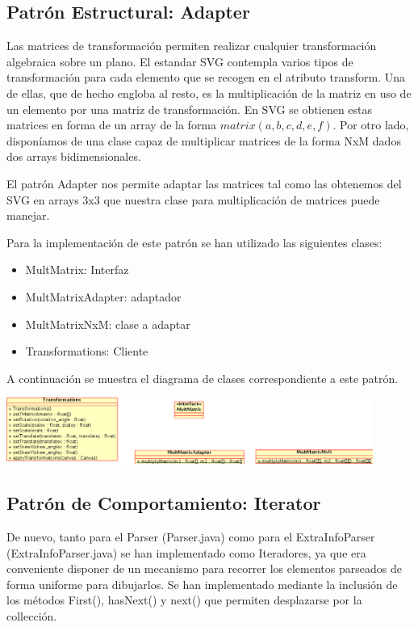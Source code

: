 \documentclass[a4paper,10pt]{article}
\begin{document}
\subsection{Patrón Estructural: Adapter}

Las matrices de transformación permiten realizar cualquier transformación algebraica sobre un plano. El estandar SVG contempla varios tipos de transformación para cada elemento que se recogen en el atributo transform. Una de ellas, que de hecho engloba al resto, es la multiplicación de la matriz en uso de un elemento por una matriz de transformación. En SVG se obtienen estas matrices en forma de un array de la forma $matrix(a,b,c,d,e,f)$. Por otro lado, disponíamos de una clase capaz de multiplicar matrices de la forma NxM dados dos arrays bidimensionales.

El patrón Adapter nos permite adaptar las matrices tal como las obtenemos del SVG en arrays 3x3 que nuestra clase para multiplicación de matrices puede manejar.

Para la implementación de este patrón se han utilizado las siguientes clases:

\begin{itemize}
\item MultMatrix: Interfaz
\item MultMatrixAdapter: adaptador
\item MultMatrixNxM: clase a adaptar
\item Transformations: Cliente                        
\end{itemize}

A continuación se muestra el diagrama de clases correspondiente a este patrón.

\begin{center}
 \includegraphics[width=12cm]{texres/adapter.png}
\end{center}

\subsection{Patrón de Comportamiento: Iterator}

De nuevo, tanto para el Parser (Parser.java) como para el ExtraInfoParser (ExtraInfoParser.java) se han implementado como Iteradores, ya que era conveniente disponer de un mecanismo para recorrer los elementos parseados de forma uniforme para dibujarlos. Se han implementado mediante la inclusión de los métodos First(), hasNext() y next() que permiten desplazarse por la collección.
\end{document}
